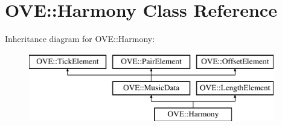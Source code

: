 \hypertarget{class_o_v_e_1_1_harmony}{}\section{O\+VE\+:\+:Harmony Class Reference}
\label{class_o_v_e_1_1_harmony}
Inheritance diagram for O\+VE\+:\+:Harmony\+:\begin{figure}[H]
\begin{center}
\leavevmode
\includegraphics[height=3.000000cm]{class_o_v_e_1_1_harmony}
\end{center}
\end{figure}
